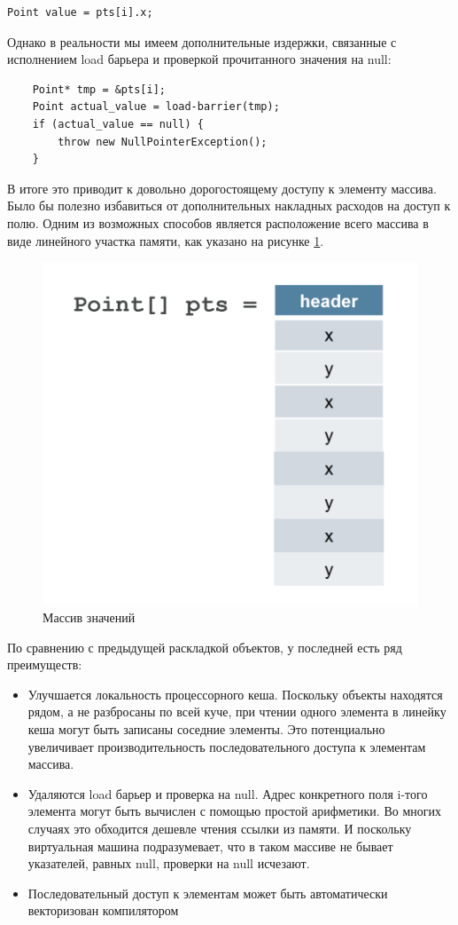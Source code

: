 \begin{lstlisting}
Point value = pts[i].x;
\end{lstlisting}
Однако в реальности мы имеем дополнительные издержки, связанные с исполнением load барьера и проверкой прочитанного значения на null:
\begin{lstlisting}
	Point* tmp = &pts[i];
	Point actual_value = load-barrier(tmp);
	if (actual_value == null) {
		throw new NullPointerException();
	}
\end{lstlisting}
В итоге это приводит к довольно дорогостоящему доступу к элементу массива. Было бы полезно избавиться от дополнительных накладных расходов на доступ к полю. Одним из возможных способов является расположение всего массива в виде линейного участка памяти, как указано на рисунке \ref{values-graph}.

\begin{figure}[h]
	\caption{Массив значений}\label{values-graph}
	\includegraphics[width=0.65\linewidth]{image/flattened-points.png}
\end{figure}
По сравнению с предыдущей раскладкой объектов, у последней есть ряд преимуществ:
\begin{itemize}
	\item Улучшается локальность процессорного кеша. Поскольку объекты находятся рядом, а не разбросаны по всей куче, при чтении одного элемента в линейку кеша могут быть записаны соседние элементы. Это потенциально увеличивает производительность последовательного доступа к элементам массива.
	\item Удаляются load барьер и проверка на null. Адрес конкретного поля i-того элемента могут быть вычислен с помощью простой арифметики. Во многих случаях это обходится дешевле чтения ссылки из памяти. И поскольку виртуальная машина подразумевает, что в таком массиве не бывает указателей, равных null, проверки на null исчезают.
	\item Последовательный доступ к элементам может быть автоматически векторизован компилятором
\end{itemize}
